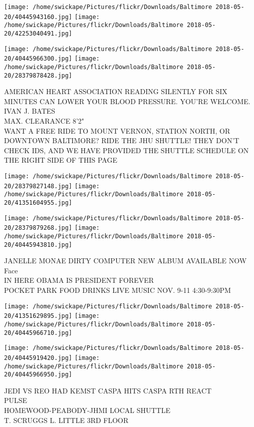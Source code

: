 \documentclass[10pt,letterpaper]{article}
\begin{document}
\texttt{[image: /home/swickape/Pictures/flickr/Downloads/Baltimore 2018-05-20/40445943160.jpg]}
\texttt{[image: /home/swickape/Pictures/flickr/Downloads/Baltimore 2018-05-20/42253040491.jpg]}

\texttt{[image: /home/swickape/Pictures/flickr/Downloads/Baltimore 2018-05-20/40445966300.jpg]}
\texttt{[image: /home/swickape/Pictures/flickr/Downloads/Baltimore 2018-05-20/28379878428.jpg]}

AMERICAN HEART ASSOCIATION READING SILENTLY FOR SIX MINUTES CAN LOWER YOUR BLOOD PRESSURE.  YOU'RE WELCOME.\\
IVAN J. BATES\\
MAX. CLEARANCE 8'2"\\
WANT A FREE RIDE TO MOUNT VERNON, STATION NORTH, OR DOWNTOWN BALTIMORE?  RIDE THE JHU SHUTTLE!  THEY DON'T CHECK IDS, AND WE HAVE PROVIDED THE SHUTTLE SCHEDULE ON THE RIGHT SIDE OF THIS PAGE\\
\pagebreak

\texttt{[image: /home/swickape/Pictures/flickr/Downloads/Baltimore 2018-05-20/28379827148.jpg]}
\texttt{[image: /home/swickape/Pictures/flickr/Downloads/Baltimore 2018-05-20/41351604955.jpg]}

\texttt{[image: /home/swickape/Pictures/flickr/Downloads/Baltimore 2018-05-20/28379879268.jpg]}
\texttt{[image: /home/swickape/Pictures/flickr/Downloads/Baltimore 2018-05-20/40445943810.jpg]}

JANELLE MONAE DIRTY COMPUTER NEW ALBUM AVAILABLE NOW\\
Face\\
IN HERE OBAMA IS PRESIDENT FOREVER\\
POCKET PARK FOOD DRINKS LIVE MUSIC NOV. 9{-}11 4:30{-}9:30PM\\
\pagebreak

\texttt{[image: /home/swickape/Pictures/flickr/Downloads/Baltimore 2018-05-20/41351629895.jpg]}
\texttt{[image: /home/swickape/Pictures/flickr/Downloads/Baltimore 2018-05-20/40445966710.jpg]}

\texttt{[image: /home/swickape/Pictures/flickr/Downloads/Baltimore 2018-05-20/40445919420.jpg]}
\texttt{[image: /home/swickape/Pictures/flickr/Downloads/Baltimore 2018-05-20/40445966950.jpg]}

JEDI VS REO HAD KEMST CASPA HITS CASPA RTH REACT\\
PULSE\\
HOMEWOOD{-}PEABODY{-}JHMI LOCAL SHUTTLE\\
T. SCRUGGS L. LITTLE 3RD FLOOR\\
\pagebreak
\end{document}
